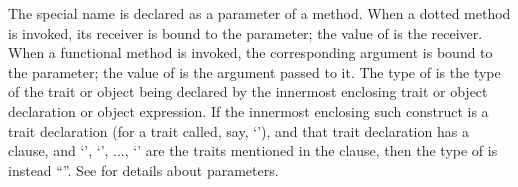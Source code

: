 The special name  is declared as a parameter of a method.
When a dotted method is invoked, its receiver is bound to
the  parameter; the value of  is the receiver.
When a functional method is invoked, the corresponding argument is bound to
the  parameter; the value of  is the argument passed to it.
The type of  is the type of the trait or object being declared by
the innermost enclosing trait or object declaration or object expression.
If the innermost enclosing such construct is a trait declaration (for a trait called,
say, `'), and that trait declaration has a  clause,
and `', `', ..., `' are the traits mentioned in
the  clause, then the type of  is instead
``''.
%
See  for details about  parameters.
